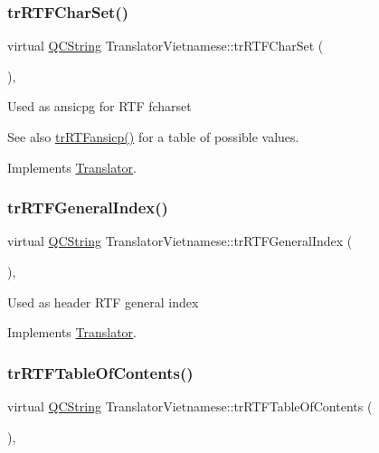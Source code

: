 \subsubsection{\texorpdfstring{trRTFCharSet()}{trRTFCharSet()}}
{\footnotesize\ttfamily virtual \mbox{\hyperlink{class_q_c_string}{Q\+C\+String}} Translator\+Vietnamese\+::tr\+R\+T\+F\+Char\+Set (\begin{DoxyParamCaption}{ }\end{DoxyParamCaption})\hspace{0.3cm}{\ttfamily [inline]}, {\ttfamily [virtual]}}

Used as ansicpg for R\+TF fcharset \begin{DoxySeeAlso}{See also}
\mbox{\hyperlink{class_translator_vietnamese_ac4cd9cfaabff4434e80e30001ae14b01}{tr\+R\+T\+Fansicp()}} for a table of possible values. 
\end{DoxySeeAlso}


Implements \mbox{\hyperlink{class_translator_afad391f3cbfb5ce6332b7239f8e2049a}{Translator}}.

\mbox{\label{class_translator_vietnamese_aedff9653f4f64f7b67e2ddf864108d54}} 
\subsubsection{\texorpdfstring{trRTFGeneralIndex()}{trRTFGeneralIndex()}}
{\footnotesize\ttfamily virtual \mbox{\hyperlink{class_q_c_string}{Q\+C\+String}} Translator\+Vietnamese\+::tr\+R\+T\+F\+General\+Index (\begin{DoxyParamCaption}{ }\end{DoxyParamCaption})\hspace{0.3cm}{\ttfamily [inline]}, {\ttfamily [virtual]}}

Used as header R\+TF general index 

Implements \mbox{\hyperlink{class_translator}{Translator}}.

\mbox{\label{class_translator_vietnamese_ac98c62af9a20f4b585c395291ee77119}} 
\subsubsection{\texorpdfstring{trRTFTableOfContents()}{trRTFTableOfContents()}}
{\footnotesize\ttfamily virtual \mbox{\hyperlink{class_q_c_string}{Q\+C\+String}} Translator\+Vietnamese\+::tr\+R\+T\+F\+Table\+Of\+Contents (\begin{DoxyParamCaption}{ }\end{DoxyParamCaption})\hspace{0.3cm}{\ttfamily [inline]}, {\ttfamily [virtual]}}

